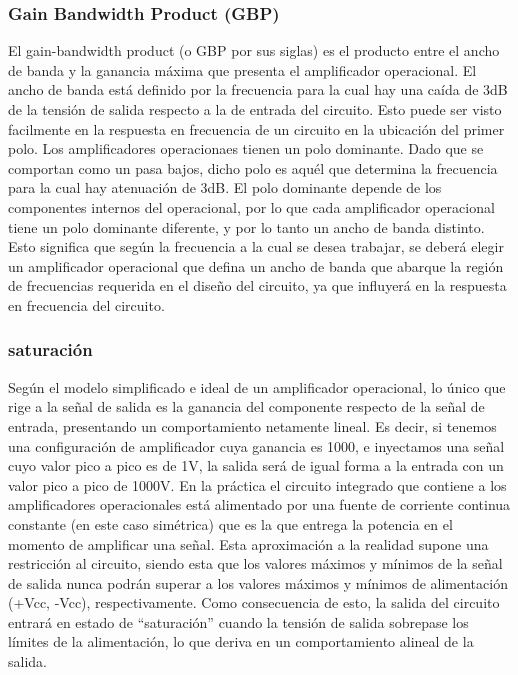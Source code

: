 	\subsubsection{Gain Bandwidth Product (GBP)}
	El gain-bandwidth product (o GBP por sus siglas) es el producto entre el ancho de banda 
	y la ganancia máxima que presenta el amplificador operacional. El ancho de banda est\'a
	definido por la frecuencia para la cual hay una ca\'ida de 3dB de la tensi\'on de salida
	respecto a la de entrada del circuito. Esto puede ser visto facilmente en la respuesta
	en frecuencia de un circuito en la ubicaci\'on del primer polo. Los amplificadores
	operacionaes tienen un polo dominante. Dado que se comportan como un pasa bajos, dicho 
	polo es aqu\'el que determina la frecuencia para la cual hay atenuaci\'on de 3dB. El polo 
	dominante depende de los componentes internos del operacional, por lo que cada amplificador
	operacional tiene un polo dominante diferente, y por lo tanto un ancho de banda distinto. Esto
	significa que seg\'un la frecuencia a la cual se desea trabajar, se deber\'a elegir un 
	amplificador operacional que defina un ancho de banda que abarque la regi\'on de frecuencias 
	requerida en el dise\~no del circuito, ya que influyer\'a en la respuesta en frecuencia
	del circuito.
	

	\subsubsection{saturación}
	Según el modelo simplificado e ideal de un amplificador operacional, lo único que rige a la señal de salida es la ganancia del componente respecto de la señal de entrada, presentando un comportamiento netamente lineal. Es decir, si tenemos una configuración de amplificador cuya ganancia es 1000, e inyectamos una señal cuyo valor pico a pico es de 1V, la salida será de igual forma a la entrada con un valor pico a pico de 1000V.
En la práctica el circuito integrado que contiene a los amplificadores operacionales está alimentado por una fuente de corriente continua constante (en este caso simétrica) que es la que entrega la potencia en el momento de amplificar una señal. Esta aproximación a la realidad supone una restricción al circuito, siendo esta que los valores máximos y mínimos de la señal de salida nunca podrán superar a los valores máximos y mínimos de alimentación (+Vcc, -Vcc), respectivamente. Como consecuencia de esto, la salida del circuito entrará en estado de “saturación” cuando la tensión de salida sobrepase los límites de la alimentación, lo que deriva en un comportamiento alineal de la salida. 

